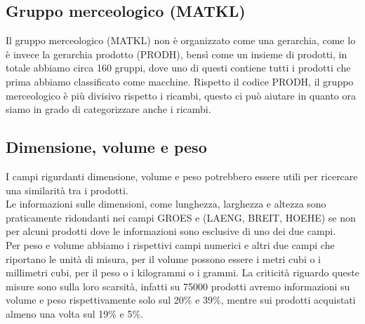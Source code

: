 \subsection{Gruppo merceologico (MATKL)}
Il gruppo merceologico (MATKL) non è organizzato come una gerarchia, come lo è invece la gerarchia prodotto (PRODH), bensì come un insieme di prodotti, in totale abbiamo circa 160 gruppi, dove uno di questi contiene tutti i prodotti che prima abbiamo classificato come macchine. Rispetto il codice PRODH, il gruppo merceologico è più divisivo rispetto i ricambi, questo ci può aiutare in quanto ora siamo in grado di categorizzare anche i ricambi. 

\subsection{Dimensione, volume e peso}
I campi rigurdanti dimensione, volume e peso potrebbero essere utili per ricercare una similarità tra i prodotti.\\
Le informazioni sulle dimensioni, come lunghezza, larghezza e altezza sono praticamente ridondanti nei campi GROES e (LAENG, BREIT, HOEHE) se non per alcuni prodotti dove le informazioni sono esclusive di uno dei due campi.\\
Per peso e volume abbiamo i rispettivi campi numerici e altri due campi che riportano le unità di misura, per il volume possono essere i metri cubi o i millimetri cubi, per il peso o i kilogrammi o i grammi.
La criticità riguardo queste misure sono sulla loro scarsità, infatti su 75000 prodotti avremo informazioni su volume e peso rispettivamente solo sul 20\% e 39\%, mentre sui prodotti acquistati almeno una volta sul 19\% e 5\%. 